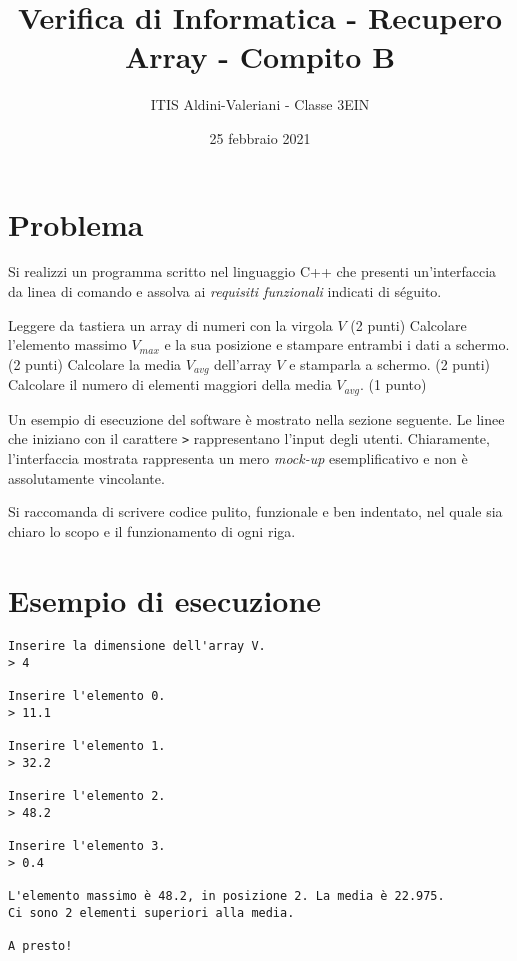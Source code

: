 \documentclass[a4paper, 11pt]{exam}
\title{Verifica di Informatica - Recupero Array - Compito B}
\author{ITIS Aldini-Valeriani - Classe 3EIN}
\date{25 febbraio 2021}
\begin{document}
\maketitle
\begin{center}

\end{center}
\vspace{1em}

\section*{Problema}

Si realizzi un programma scritto nel linguaggio C++ che presenti un'interfaccia da linea di comando e assolva ai \textit{requisiti funzionali} indicati di séguito.

\begin{questions}
	\question Leggere da tastiera un array di numeri con la virgola $V$ (2 punti)
	\question Calcolare l'elemento massimo $V_{max}$ e la sua posizione e stampare entrambi i dati a schermo. (2 punti)
	\question Calcolare la media $V_{avg}$ dell'array $V$ e stamparla a schermo. (2 punti)
	\question Calcolare il numero di elementi maggiori della media $V_{avg}$. (1 punto)
\end{questions}

Un esempio di esecuzione del software è mostrato nella sezione seguente. 
Le linee che iniziano con il carattere \texttt{>} rappresentano l'input degli utenti.
Chiaramente, l'interfaccia mostrata rappresenta un mero \textit{mock-up} esemplificativo e non è assolutamente vincolante. 

Si raccomanda di scrivere codice pulito, funzionale e ben indentato, nel quale sia chiaro lo scopo e il funzionamento di ogni riga.
\section*{Esempio di esecuzione}

\begin{verbatim}
Inserire la dimensione dell'array V.
> 4

Inserire l'elemento 0.
> 11.1

Inserire l'elemento 1.
> 32.2

Inserire l'elemento 2.
> 48.2

Inserire l'elemento 3.
> 0.4

L'elemento massimo è 48.2, in posizione 2. La media è 22.975.
Ci sono 2 elementi superiori alla media.

A presto!
\end{verbatim}
\end{document}
